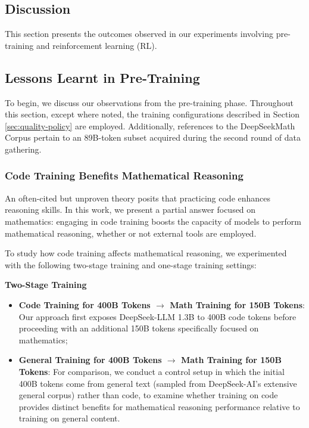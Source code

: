 \begin{itemize}[topsep=0pt]
\begin{itemize}[topsep=0pt]
\section{Discussion}
This section presents the outcomes observed in our experiments involving pre-training and reinforcement learning (RL).

\subsection{Lessons Learnt in Pre-Training}

To begin, we discuss our observations from the pre-training phase. Throughout this section, except where noted, the training configurations described in Section \ref{sec:quality-policy} are employed. Additionally, references to the DeepSeekMath Corpus pertain to an 89B-token subset acquired during the second round of data gathering.

\subsubsection{Code Training Benefits Mathematical Reasoning}

An often-cited but unproven theory posits that practicing code enhances reasoning skills. In this work, we present a partial answer focused on mathematics: engaging in code training boosts the capacity of models to perform mathematical reasoning, whether or not external tools are employed.

To study how code training affects mathematical reasoning, we experimented with the following two-stage training and one-stage training settings:

\textbf{Two-Stage Training}

\begin{itemize}[topsep=0pt]
    \item \textbf{Code Training for 400B Tokens $\rightarrow$ Math Training for 150B Tokens}: Our approach first exposes DeepSeek-LLM 1.3B to 400B code tokens before proceeding with an additional 150B tokens specifically focused on mathematics;
    \item \textbf{General Training for 400B Tokens $\rightarrow$ Math Training for 150B Tokens}: For comparison, we conduct a control setup in which the initial 400B tokens come from general text (sampled from DeepSeek-AI’s extensive general corpus) rather than code, to examine whether training on code provides distinct benefits for mathematical reasoning performance relative to training on general content.
\end{itemize}


\end{itemize}
\end{itemize}
